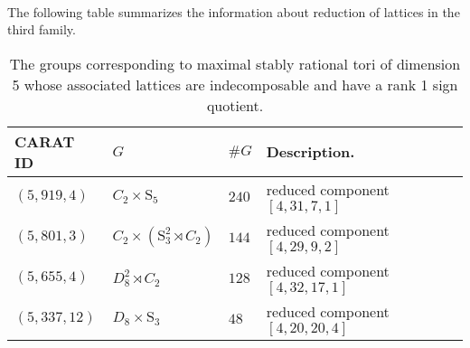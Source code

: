 \documentclass{article}
\theoremstyle{plain}
\theoremstyle{definition}
\newcommand{\Z}{\ensuremath{\mathbb{Z}}}
\newcommand{\exactseqs}[1]{\ensuremath{0 \longrightarrow M_{#1} \longrightarrow L_{#1} \longrightarrow \Z^{-} \longrightarrow 0}}
\begin{document}
\\
The following table summarizes the information about reduction of lattices in the third family.
 \begin{table}[H]
\centering
\begin{tabular}{lllll} 
 CARAT ID & $G$ & $\#G$ & Description.\\\hline
 $(5,919,4)$ & $C_2\times \mathrm{S}_5$ & $240$  &  reduced component $[4,31,7,1]$ \\
 $(5,801,3)$ & $C_2\times (\mathrm{S}_3^2\rtimes C_2)$ & $144$  &reduced component $[ 4, 29, 9, 2 ]$  \\
 $(5,655,4)$ & $D_8^2\rtimes C_2$ & $128$  & reduced component $[4,32,17,1]$    \\
 $(5,337,12)$ & $D_8\times \mathrm{S}_3$ & $48$  &  reduced component $[ 4, 20, 20, 4 ]$   &\\
\end{tabular}
\caption{The groups corresponding to maximal stably rational tori of dimension 5 whose associated lattices are indecomposable and have a rank 1 sign quotient.}
\label{SignPerm}
\end{table}
\end{document}
